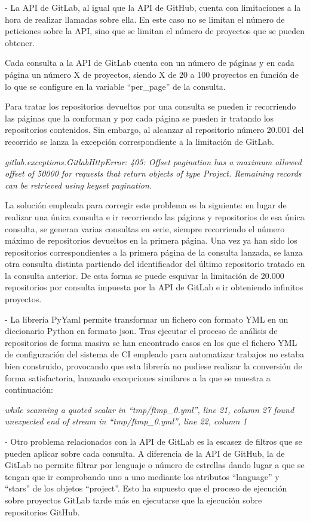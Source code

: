 - La API de GitLab, al igual que la API de GitHub, cuenta con limitaciones a la hora de realizar llamadas sobre ella. En este caso no se limitan el número de peticiones sobre la API, sino que se limitan el número de proyectos que se pueden obtener.

Cada consulta a la API de GitLab cuenta con un número de páginas y en cada página un número X de proyectos, siendo X de 20 a 100 proyectos en función de lo que se configure en la variable ``per\_page'' de la consulta. 

Para tratar los repositorios devueltos por una consulta se pueden ir recorriendo las páginas que la conforman y por cada página se pueden ir tratando los repositorios contenidos. Sin embargo, al alcanzar al repositorio número 20.001 del recorrido se lanza la excepción correspondiente a la limitación de GitLab.

\textit{gitlab.exceptions.GitlabHttpError: 405: Offset pagination has a maximum allowed offset of 50000 for requests that return objects of type Project. Remaining records can be retrieved using keyset pagination.}

La solución empleada para corregir este problema es la siguiente: en lugar de realizar una única consulta e ir recorriendo las páginas y repositorios de esa única consulta, se generan varias consultas en serie, siempre recorriendo el número máximo de repositorios devueltos en la primera página. Una vez ya han sido los repositorios correspondientes a la primera página de la consulta lanzada, se lanza otra consulta distinta partiendo del identificador del último repositorio tratado en la consulta anterior. De esta forma se puede esquivar la limitación de 20.000 repositorios por consulta impuesta por la API de GitLab e ir obteniendo infinitos proyectos.

- La librería PyYaml permite transformar un fichero con formato YML en un diccionario Python en formato json. Tras ejecutar el proceso de análisis de repositorios de forma masiva se han encontrado casos en los que el fichero YML de configuración del sistema de CI empleado para automatizar trabajos no estaba bien construido, provocando que esta librería no pudiese realizar la conversión de forma satisfactoria, lanzando excepciones similares a la que se muestra a continuación:

\textit{while scanning a quoted scalar in ``tmp/ftmp\_0.yml'', line 21, column 27 found unexpected end of stream in ``tmp/ftmp\_0.yml'', line 22, column 1}

- Otro problema relacionados con la API de GitLab es la escasez de filtros que se pueden aplicar sobre cada consulta. A diferencia de la API de GitHub, la de GitLab no permite filtrar por lenguaje o número de estrellas dando lugar a que se tengan que ir comprobando uno a uno mediante los atributos ``language'' y ``stars'' de los objetos ``project''. Esto ha supuesto que el proceso de ejecución sobre proyectos GitLab tarde más en ejecutarse que la ejecución sobre repositorios GitHub.